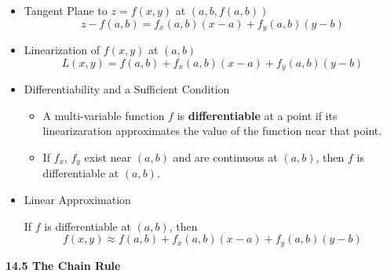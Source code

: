 \documentclass[12pt]{article}
\newcommand{\<}{\left<}
\renewcommand{\>}{\right>}
\begin{document}
\begin{itemize}

  \item Tangent Plane to $z=f(x,y)$ at $(a,b,f(a,b))$
    \[
      z-f(a,b)=f_x(a,b)(x-a)+f_y(a,b)(y-b)
    \]

  \item Linearization of $f(x,y)$ at $(a,b)$
    \[
      L(x,y) = f(a,b)+f_x(a,b)(x-a)+f_y(a,b)(y-b)
    \]

  \item Differentiability and a Sufficient Condition
    \begin{itemize}
      \item A multi-variable function $f$ is \textbf{differentiable} at a point if its linearizaration approximates the value of the function near that point.
      \item If $f_x$, $f_y$ exist near $(a,b)$ and are continuous at $(a,b)$, then $f$ is differentiable at $(a,b)$.
    \end{itemize}

  \item Linear Approximation

    If $f$ is differentiable at $(a,b)$, then
      \[
        f(x,y) \approx f(a,b)+f_x(a,b)(x-a)+f_y(a,b)(y-b)
      \]

\end{itemize}

\newpage

\centerline{\bf 14.5 The Chain Rule}
\end{document}
